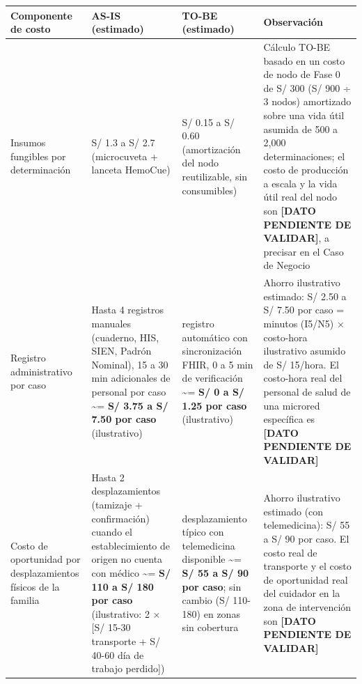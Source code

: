 \documentclass[11pt,a4paper]{article}
\begin{document}
{\small
\begin{longtable}[]{@{}
  >{\raggedright\arraybackslash}p{}
  >{\raggedright\arraybackslash}p{}
  >{\raggedright\arraybackslash}p{}
  >{\raggedright\arraybackslash}p{}@{}}
\toprule\noalign{}
\begin{minipage}[b]{\linewidth}\raggedright
Componente de costo
\end{minipage} & \begin{minipage}[b]{\linewidth}\raggedright
AS-IS (estimado)
\end{minipage} & \begin{minipage}[b]{\linewidth}\raggedright
TO-BE (estimado)
\end{minipage} & \begin{minipage}[b]{\linewidth}\raggedright
Observación
\end{minipage} \\
\midrule\noalign{}
\endhead
\bottomrule\noalign{}
\endlastfoot
Insumos fungibles por determinación & S/ 1.3 a S/ 2.7 (microcuveta + lanceta HemoCue) & S/ 0.15 a S/ 0.60 (amortización del nodo reutilizable, sin consumibles) & Cálculo TO-BE basado en un costo de nodo de Fase 0 de S/ 300 (S/ 900 ÷ 3 nodos) amortizado sobre una vida útil asumida de 500 a 2,000 determinaciones; el costo de producción a escala y la vida útil real del nodo son \textbf{{[}DATO PENDIENTE DE VALIDAR{]}}, a precisar en el Caso de Negocio \\
Registro administrativo por caso & Hasta 4 registros manuales (cuaderno, HIS, SIEN, Padrón Nominal), 15 a 30 min adicionales de personal por caso \textasciitilde= \textbf{S/ 3.75 a S/ 7.50 por caso} (ilustrativo) & 1 registro automático con sincronización FHIR, 0 a 5 min de verificación \textasciitilde= \textbf{S/ 0 a S/ 1.25 por caso} (ilustrativo) & Ahorro ilustrativo estimado: S/ 2.50 a S/ 7.50 por caso = minutos (I5/N5) × costo-hora ilustrativo asumido de S/ 15/hora. El costo-hora real del personal de salud de una microred específica es \textbf{{[}DATO PENDIENTE DE VALIDAR{]}} \\
Costo de oportunidad por desplazamientos físicos de la familia & Hasta 2 desplazamientos (tamizaje + confirmación) cuando el establecimiento de origen no cuenta con médico \textasciitilde= \textbf{S/ 110 a S/ 180 por caso} (ilustrativo: 2 × {[}S/ 15-30 transporte + S/ 40-60 día de trabajo perdido{]}) & 1 desplazamiento típico con telemedicina disponible \textasciitilde= \textbf{S/ 55 a S/ 90 por caso}; sin cambio (S/ 110-180) en zonas sin cobertura & Ahorro ilustrativo estimado (con telemedicina): S/ 55 a S/ 90 por caso. El costo real de transporte y el costo de oportunidad real del cuidador en la zona de intervención son \textbf{{[}DATO PENDIENTE DE VALIDAR{]}} \\

\end{longtable}}
\end{document}
